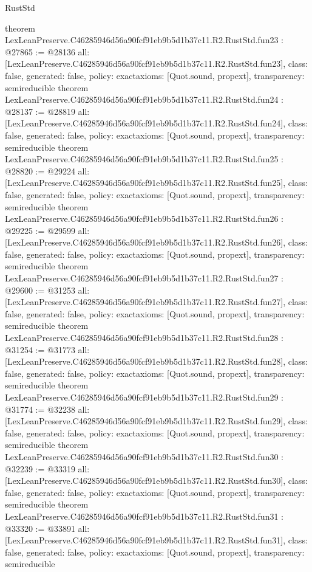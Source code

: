 \begin{lexlean}{RustStd}
\begin{coremodule}
{}
theorem LexLeanPreserve.C46285946d56a90fcf91eb9b5d1b37c11.R2.RustStd.fun23 : @27865 := @28136 {
  all: [LexLeanPreserve.C46285946d56a90fcf91eb9b5d1b37c11.R2.RustStd.fun23],
  class: false,
  generated: false,
  policy: exact{axioms: [Quot.sound, propext]},
  transparency: semireducible
}
theorem LexLeanPreserve.C46285946d56a90fcf91eb9b5d1b37c11.R2.RustStd.fun24 : @28137 := @28819 {
  all: [LexLeanPreserve.C46285946d56a90fcf91eb9b5d1b37c11.R2.RustStd.fun24],
  class: false,
  generated: false,
  policy: exact{axioms: [Quot.sound, propext]},
  transparency: semireducible
}
theorem LexLeanPreserve.C46285946d56a90fcf91eb9b5d1b37c11.R2.RustStd.fun25 : @28820 := @29224 {
  all: [LexLeanPreserve.C46285946d56a90fcf91eb9b5d1b37c11.R2.RustStd.fun25],
  class: false,
  generated: false,
  policy: exact{axioms: [Quot.sound, propext]},
  transparency: semireducible
}
theorem LexLeanPreserve.C46285946d56a90fcf91eb9b5d1b37c11.R2.RustStd.fun26 : @29225 := @29599 {
  all: [LexLeanPreserve.C46285946d56a90fcf91eb9b5d1b37c11.R2.RustStd.fun26],
  class: false,
  generated: false,
  policy: exact{axioms: [Quot.sound, propext]},
  transparency: semireducible
}
theorem LexLeanPreserve.C46285946d56a90fcf91eb9b5d1b37c11.R2.RustStd.fun27 : @29600 := @31253 {
  all: [LexLeanPreserve.C46285946d56a90fcf91eb9b5d1b37c11.R2.RustStd.fun27],
  class: false,
  generated: false,
  policy: exact{axioms: [Quot.sound, propext]},
  transparency: semireducible
}
theorem LexLeanPreserve.C46285946d56a90fcf91eb9b5d1b37c11.R2.RustStd.fun28 : @31254 := @31773 {
  all: [LexLeanPreserve.C46285946d56a90fcf91eb9b5d1b37c11.R2.RustStd.fun28],
  class: false,
  generated: false,
  policy: exact{axioms: [Quot.sound, propext]},
  transparency: semireducible
}
theorem LexLeanPreserve.C46285946d56a90fcf91eb9b5d1b37c11.R2.RustStd.fun29 : @31774 := @32238 {
  all: [LexLeanPreserve.C46285946d56a90fcf91eb9b5d1b37c11.R2.RustStd.fun29],
  class: false,
  generated: false,
  policy: exact{axioms: [Quot.sound, propext]},
  transparency: semireducible
}
theorem LexLeanPreserve.C46285946d56a90fcf91eb9b5d1b37c11.R2.RustStd.fun30 : @32239 := @33319 {
  all: [LexLeanPreserve.C46285946d56a90fcf91eb9b5d1b37c11.R2.RustStd.fun30],
  class: false,
  generated: false,
  policy: exact{axioms: [Quot.sound, propext]},
  transparency: semireducible
}
theorem LexLeanPreserve.C46285946d56a90fcf91eb9b5d1b37c11.R2.RustStd.fun31 : @33320 := @33891 {
  all: [LexLeanPreserve.C46285946d56a90fcf91eb9b5d1b37c11.R2.RustStd.fun31],
  class: false,
  generated: false,
  policy: exact{axioms: [Quot.sound, propext]},
  transparency: semireducible
}
\end{coremodule}
\end{lexlean}
